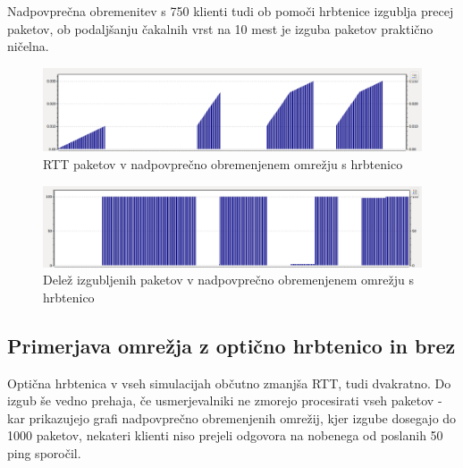 \documentclass[a4paper,11pt]{article}
\begin{document}
\pagebreak

Nadpovprečna obremenitev s 750 klienti tudi ob pomoči hrbtenice izgublja precej paketov, ob podaljšanju čakalnih vrst na 10 mest je izguba paketov praktično ničelna.

\begin{figure}[h]
	\centering
	\includegraphics[width=\textwidth]{hRtt2.png}
	\caption{RTT paketov v nadpovprečno obremenjenem omrežju s hrbtenico}
	\label{RTT6}	
\end{figure}

\begin{figure}[h]
	\centering
	\includegraphics[width=\textwidth]{hLoss2.png}
	\caption{Delež izgubljenih paketov v nadpovprečno obremenjenem omrežju s hrbtenico}
	\label{hPL2}	
\end{figure}

\pagebreak
\subsection{Primerjava omrežja z optično hrbtenico in brez} \par
Optična hrbtenica v vseh simulacijah občutno zmanjša RTT, tudi dvakratno. Do izgub še vedno prehaja, če usmerjevalniki ne zmorejo procesirati vseh paketov - kar prikazujejo grafi nadpovprečno obremenjenih omrežij, kjer izgube dosegajo do 1000 paketov, nekateri klienti niso prejeli odgovora na nobenega od poslanih 50 ping sporočil.
\end{document}
